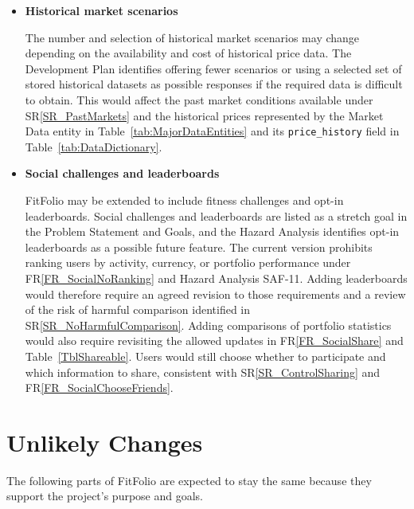 \documentclass[12pt]{article}
\newcommand{\srref}[1]{SR\ref{#1}}
\newcommand{\rref}[1]{FR\ref{#1}}
\newcounter{lcnum} %
\begin{document}
\begin{itemize}
\item[LC\refstepcounter{lcnum}\thelcnum\label{LC_fourthChange}:] 
\textbf{Historical market scenarios}

The number and selection of historical market scenarios may change depending on the availability and cost of historical price data. The Development Plan identifies offering fewer scenarios or using a selected set of stored historical datasets as possible responses if the required data is difficult to obtain. This would affect the past market conditions available under \srref{SR_PastMarkets} and the historical prices represented by the Market Data entity in Table~\ref{tab:MajorDataEntities} and its \texttt{price\_history} field in Table~\ref{tab:DataDictionary}.


\item[LC\refstepcounter{lcnum}\thelcnum\label{LC_5thChange}:] 
\textbf{Social challenges and leaderboards}

FitFolio may be extended to include fitness challenges and opt-in leaderboards. Social challenges and leaderboards are listed as a stretch goal in the Problem Statement and Goals, and the Hazard Analysis identifies opt-in leaderboards as a possible future feature. The current version prohibits ranking users by activity, currency, or portfolio performance under \rref{FR_SocialNoRanking} and Hazard Analysis SAF-11. Adding leaderboards would therefore require an agreed revision to those requirements and a review of the risk of harmful comparison identified in \srref{SR_NoHarmfulComparison}. Adding comparisons of portfolio statistics would also require revisiting the allowed updates in \rref{FR_SocialShare} and Table~\ref{TblShareable}. Users would still choose whether to participate and which information to share, consistent with \srref{SR_ControlSharing} and \rref{FR_SocialChooseFriends}.


\end{itemize}

\section{Unlikely Changes}

The following parts of FitFolio are expected to stay the same because they support the project's purpose and goals.
\end{document}

